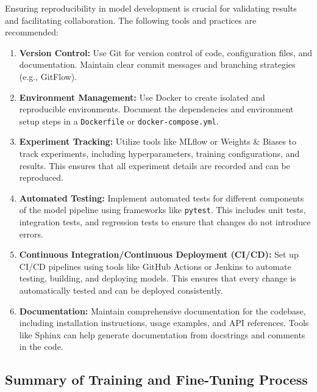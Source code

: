 \documentclass{article}
\begin{document}
Ensuring reproducibility in model development is crucial for validating results and facilitating collaboration. The following tools and practices are recommended:

\begin{enumerate}
    \item \textbf{Version Control:} Use Git for version control of code, configuration files, and documentation. Maintain clear commit messages and branching strategies (e.g., GitFlow).
    \item \textbf{Environment Management:} Use Docker to create isolated and reproducible environments. Document the dependencies and environment setup steps in a \texttt{Dockerfile} or \texttt{docker-compose.yml}.
    \item \textbf{Experiment Tracking:} Utilize tools like MLflow or Weights \& Biases to track experiments, including hyperparameters, training configurations, and results. This ensures that all experiment details are recorded and can be reproduced.
    \item \textbf{Automated Testing:} Implement automated tests for different components of the model pipeline using frameworks like \texttt{pytest}. This includes unit tests, integration tests, and regression tests to ensure that changes do not introduce errors.
    \item \textbf{Continuous Integration/Continuous Deployment (CI/CD):} Set up CI/CD pipelines using tools like GitHub Actions or Jenkins to automate testing, building, and deploying models. This ensures that every change is automatically tested and can be deployed consistently.
    \item \textbf{Documentation:} Maintain comprehensive documentation for the codebase, including installation instructions, usage examples, and API references. Tools like Sphinx can help generate documentation from docstrings and comments in the code.
\end{enumerate}

\subsection{Summary of Training and Fine-Tuning Process}
\end{document}
